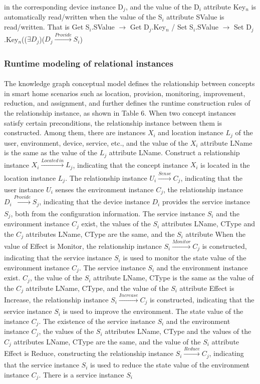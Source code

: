 in the corresponding device instance D$_{j}$, and the value of the D$_{i}$ attribute Key$_{n}$ is automatically read/written when the value of the S$_{i}$ attribute SValue is read/written. That is Get S$_{i}$.SValue $\to$ Get D$_{j}$.Key$_{n}$ / Set S$_{i}$.SValue $\to$ Set D$_{j}$.Key$_{n}$(($\exists D_{j}$)($D_{j}\xrightarrow[]{Provide} S_{i}$)




\subsubsection{Runtime modeling of relational instances}
\paragraph{}
The knowledge graph conceptual model defines the relationship between concepts in smart home scenarios such as location,  provision, monitoring, improvement, reduction, and assignment, and further defines the runtime construction rules of the relationship instance, as shown in Table 6. When two concept instances satisfy certain preconditions, the relationship instance between them is constructed. Among them, there are instances $X_{i}$ and location instance $L_{j}$ of the user, environment, device, service, etc., and the value of the $X_{i}$ attribute LName is the same as the value of the $L_{j}$ attribute LName. Construct a relationship instance $X_{i}\xrightarrow[]{Located\,in}L_{j}$, indicating that the concept instance $X_{i}$ is located in the location instance $L_{j}$. The relationship instance $U_{i}\xrightarrow[]{Sense} C_{j}$, indicating that the user instance $U_{i}$ senses the environment instance $C_{j}$, the relationship instance $D_{i}\xrightarrow[]{Provide}S_{j}$, indicating that the device instance $D_{i}$ provides the service instance $S_{j}$, both from the configuration information. The service instance $S_{i}$ and the environment instance $C_{j}$ exist, the values of the $S_{i}$ attributes LName, CType and the $C_{j}$ attributes LName, CType are the same, and the $S_{i}$ attribute When the value of Effect is Monitor, the relationship instance $S_{i}\xrightarrow[]{Monitor}C_{j}$ is constructed, indicating that the service instance $S_{i}$ is used to monitor the state value of the environment instance $C_{j}$. The service instance $S_{i}$ and the environment instance exist. $C_{j}$, the value of the $S_{i}$ attribute LName, CType is the same as the value of the $C_{j}$ attribute LName, CType, and the value of the $S_{i}$ attribute Effect is Increase, the relationship instance $S_{i}\xrightarrow[]{Increase}C_{j}$ is constructed, indicating that the service instance $S_{i}$ is used to improve the environment. The state value of the instance $C_{j}$. The existence of the service instance $S_{i}$ and the environment instance $C_{j}$, the values of the $S_{i}$ attributes LName, CType and the values of the $C_{j}$ attributes LName, CType are the same, and the value of the $S_{i}$ attribute Effect is Reduce, constructing the relationship instance $S_{i}\xrightarrow[]{Reduce}C_{j}$, indicating that the service instance $S_{i}$ is used to reduce the state value of the environment instance $C_{j}$. There is a service instance $S_{i}$ 